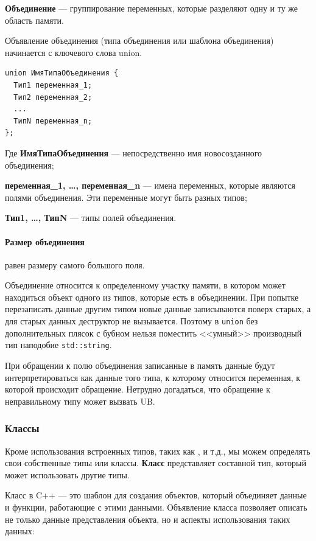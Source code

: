 \textbf{Объединение} --- группирование переменных, которые разделяют одну и ту же область памяти.

Объявление объединения (типа объединения или шаблона объединения) начинается с ключевого слова union.
\begin{verbatim}
union ИмяТипаОбъединения {
  Тип1 переменная_1;
  Тип2 переменная_2;
  ...
  ТипN переменная_n;
};
\end{verbatim}

Где \textbf{ИмяТипаОбъединения} --- непосредственно имя новосозданного объединения;

\textbf{переменная\_1, \dots, переменная\_n} --- имена переменных, которые являются полями объединения.
Эти переменные могут быть разных типов;

\textbf{Тип1, \dots, ТипN} --- типы полей объединения.

\paragraph{Размер объединения} равен размеру самого большого поля.

Объединение относится к определенному участку памяти, в котором может находиться объект одного из типов, которые есть в объединении. При попытке перезаписать данные другим типом новые данные записываются поверх старых, а для старых данных деструктор не вызывается. Поэтому в \verb|union| без дополнительных плясок с бубном нельзя поместить <<умный>> производный тип наподобие \verb|std::string|.

При обращении к полю объединения записанные в память данные будут
интерпретироваться как данные того типа, к которому относится переменная, к которой происходит обращение. Нетрудно догадаться, что обращение к неправильному типу может вызвать UB.

\subsubsection{Классы}

Кроме использования встроенных типов, таких как ,  и т.д., мы можем определять свои собственные типы или классы. \textbf{Класс} представляет составной тип, который может использовать другие типы.

Класс в C++ — это шаблон для создания объектов, который объединяет данные и функции, работающие с этими данными. Объявление класса позволяет описать не только данные представления объекта, но и аспекты использования таких данных:

